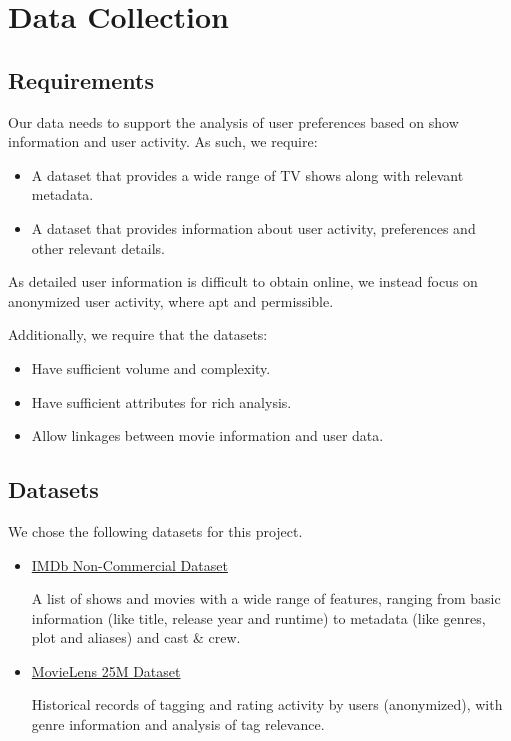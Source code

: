 \documentclass[10pt,titlepage]{article}
\begin{document}
\section{Data Collection}
\subsection{Requirements}
Our data needs to support the analysis of user preferences based on show information and user activity. As such, we
require:
\begin{itemize}
  \item A dataset that provides a wide range of TV shows along with relevant metadata.
  \item A dataset that provides information about user activity, preferences and other relevant details.
\end{itemize}

As detailed user information is difficult to obtain online, we instead focus on anonymized user activity,
where apt and permissible.

Additionally, we require that the datasets:
\begin{itemize}
  \item Have sufficient volume and complexity.
  \item Have sufficient attributes for rich analysis.
  \item Allow linkages between movie information and user data.
\end{itemize}

\subsection{Datasets}
We chose the following datasets for this project.
\begin{itemize}
    \item \href{https://developer.imdb.com/non-commercial-datasets/}{IMDb Non-Commercial Dataset}

        A list of shows and movies with a wide range of features, ranging from basic information (like title, release year
        and runtime) to metadata (like genres, plot and aliases) and cast \& crew.
    \item \href{https://grouplens.org/datasets/movielens/25m/}{MovieLens 25M Dataset}

        Historical records of tagging and rating activity by users (anonymized), with genre information and analysis of
        tag relevance.
\end{itemize}
\end{document}
